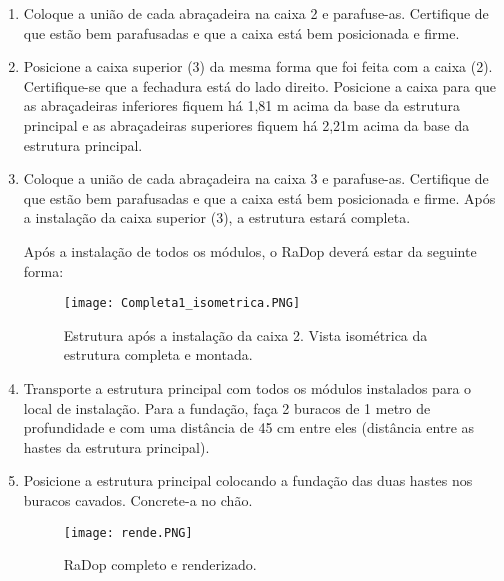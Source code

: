\begin{enumerate}
            
            \item Coloque a união de cada abraçadeira na caixa 2 e parafuse-as. Certifique de que estão bem parafusadas e que a caixa está bem posicionada e firme.
            
            \item Posicione a caixa superior (3) da mesma forma que foi feita com a caixa (2). Certifique-se que a fechadura está do lado direito. Posicione a caixa para que as abraçadeiras inferiores fiquem há 1,81 m acima da base da estrutura principal e as abraçadeiras superiores fiquem há 2,21m acima da base da estrutura principal.
            
            \item Coloque a união de cada abraçadeira na caixa 3 e parafuse-as. Certifique de que estão bem parafusadas e que a caixa está bem posicionada e firme. Após a instalação da caixa superior (3), a estrutura estará completa.
            
            Após a instalação de todos os módulos, o RaDop deverá estar da seguinte forma:
            
            
            \begin{figure}[H]
                 \centering
                 \texttt{[image: Completa1\_isometrica.PNG]}
                 \caption{Estrutura após a instalação da caixa 2. Vista isométrica da estrutura completa e montada.}
                 \label{fig:my_label}
             \end{figure}
            
            \item Transporte a estrutura principal com todos os módulos instalados para o local de instalação. 
            Para a fundação, faça 2 buracos de 1 metro de profundidade e com uma distância de 45 cm entre eles (distância entre as hastes da estrutura principal). 
            
            \item Posicione a estrutura principal colocando a fundação das duas hastes nos buracos cavados. Concrete-a no chão. 
            
            \begin{figure}[H]
                 \centering
                 \texttt{[image: rende.PNG]}
                 \caption{RaDop completo e renderizado.}
                 \label{fig:my_label}
             \end{figure}
            


\end{enumerate}
